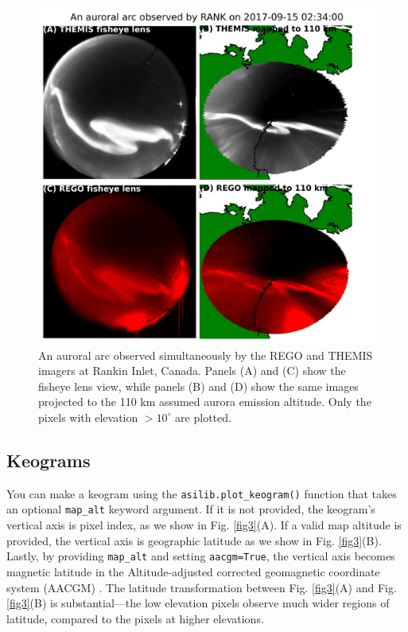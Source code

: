 \documentclass[utf8]{FrontiersinHarvard} %
\begin{document}
\begin{figure}
      \includegraphics[width=\textwidth]{figures/fig2.jpg}
      \caption{An auroral arc observed simultaneously by the REGO and THEMIS imagers at Rankin Inlet, Canada. Panels (A) and (C) show the fisheye lens view, while panels (B) and (D) show the same images projected to the 110 km assumed aurora emission altitude. Only the pixels with elevation $>10^\circ$ are plotted.}
      \label{fig2}
\end{figure}

\subsection{Keograms}
You can make a keogram using the \verb|asilib.plot_keogram()| function that takes an optional \verb|map_alt| keyword argument. If it is not provided, the keogram's vertical axis is pixel index, as we show in Fig. \ref{fig3}(A). If a valid map altitude is provided, the vertical axis is geographic latitude as we show in Fig. \ref{fig3}(B). Lastly, by providing \verb|map_alt| and setting \verb|aacgm=True|, the vertical axis becomes magnetic latitude in the Altitude-adjusted corrected geomagnetic coordinate system (AACGM) \citep{Shepherd2014}.
The latitude transformation between Fig. \ref{fig3}(A) and Fig. \ref{fig3}(B) is substantial---the low elevation pixels observe much wider regions of latitude, compared to the pixels at higher elevations.
\end{document}
